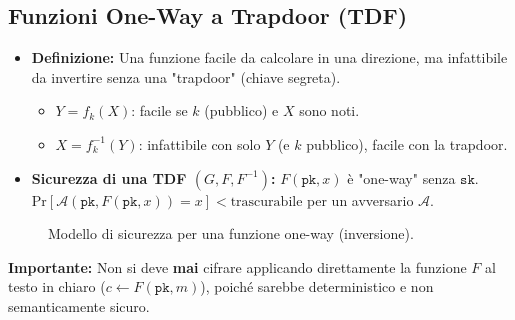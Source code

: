 \subsection{Funzioni One-Way a Trapdoor (TDF)}
\begin{itemize}
    \item \textbf{Definizione:} Una funzione facile da calcolare in una direzione, ma infattibile da invertire senza una "trapdoor" (chiave segreta).
    \begin{itemize}
        \item $Y = f_k(X)$: facile se $k$ (pubblico) e $X$ sono noti.
        \item $X = f_k^{-1}(Y)$: infattibile con solo $Y$ (e $k$ pubblico), facile con la trapdoor.
    \end{itemize}
    \item \textbf{Sicurezza di una TDF $(G, F, F^{-1})$:} $F(\texttt{pk}, x)$ è "one-way" senza $\texttt{sk}$.
    $\text{Pr}[\mathcal{A}(\texttt{pk}, F(\texttt{pk},x)) = x ] < \text{trascurabile}$ per un avversario $\mathcal{A}$.
\end{itemize}
\begin{figure}[H]
    \centering
    \caption{Modello di sicurezza per una funzione one-way (inversione).}
    \label{fig:tdf_security}
\end{figure}
\textbf{Importante:} Non si deve \textbf{mai} cifrare applicando direttamente la funzione $F$ al testo in chiaro ($c \leftarrow F(\texttt{pk}, m)$), poiché sarebbe deterministico e non semanticamente sicuro.

